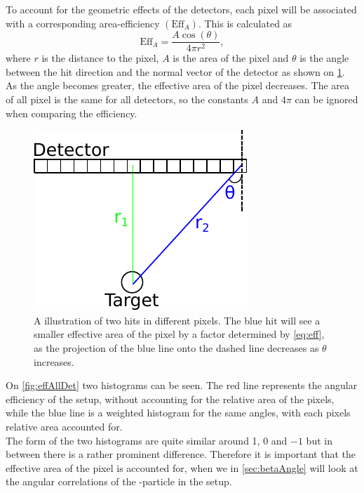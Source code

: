 To account for the geometric effects of the detectors, each pixel will be associated with a corresponding area-efficiency $(\text{Eff}_A)$.
This is calculated as 
\begin{equation}
\text{Eff}_A = \dfrac{A\cos(\theta) }{ 4 \pi r^2},
\label{eq:eff}
\end{equation}
where $r$ is the distance to the pixel, $A$ is the area of the pixel and $\theta$ is the angle between the hit direction and the normal vector of the detector as shown on \cref{fig:EffGeometry}. As the angle becomes greater, the effective area of the pixel decreases. 
The area of all pixel is the same for all detectors, so the constants $A$ and $4\pi$ can be ignored when comparing the efficiency. 


\begin{figure}[h]
	\centering
	\includegraphics[width=.7\linewidth]{../figures/detektorEffDrawingv2.pdf}
	\caption{A illustration of two hits in different pixels. The blue hit will see a smaller effective area of the pixel by a factor determined by \cref{eq:eff}, as the projection of the blue line onto the dashed line decreases as $\theta$ increases.}
	\label{fig:EffGeometry}
\end{figure}

On \cref{fig:effAllDet} two histograms can be seen. The red line represents the angular efficiency of the setup, without accounting for the relative area of the pixels, while the blue line is a weighted histogram for the same angles, with each pixels relative area accounted for. \\
The form of the two histograms are quite similar around 1, 0 and $-1$ but in between there is a rather prominent difference. Therefore it is important that the effective area of the pixel is accounted for, when we in \cref{sec:betaAngle} will look at the angular correlations of the \be-particle in the setup. 



